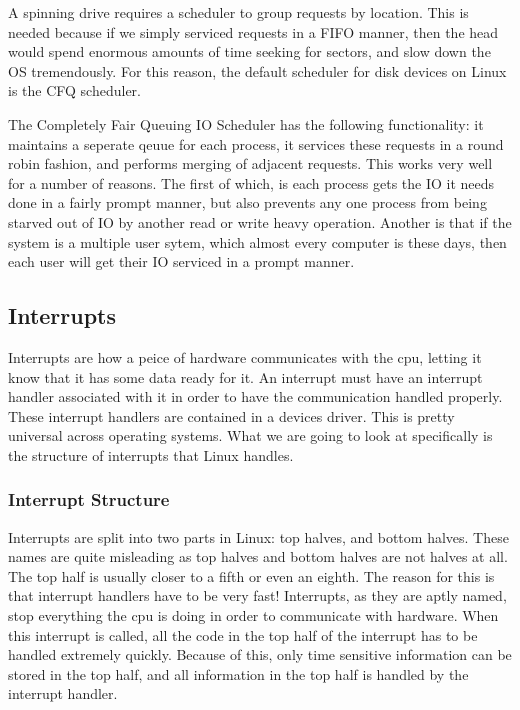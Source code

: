 \documentclass[10pt,letterpaper,onecolumn,draftclsnofoot]{IEEEtran}
\begin{document}
  A spinning drive requires a scheduler to group requests by location. This is
  needed because if we simply serviced requests in a FIFO manner, then the head
  would spend enormous amounts of time seeking for sectors, and slow down the OS
  tremendously. For this reason, the default scheduler for disk devices on Linux
  is the CFQ scheduler.

  The Completely Fair Queuing IO Scheduler has the following functionality: it
  maintains a seperate qeuue for each process, it services these requests in a round
  robin fashion, and performs merging of adjacent requests. This works very well
  for a number of reasons. The first of which, is each process gets the IO it needs
  done in a fairly prompt manner, but also prevents any one process from being
  starved out of IO by another read or write heavy operation. Another is that
  if the system is a multiple user sytem, which almost every computer is these
  days, then each user will get their IO serviced in a prompt manner. \cite{robertlove2010}

  \subsection{Interrupts}
  Interrupts are how a peice of hardware communicates with the cpu, letting it
  know that it has some data ready for it. An interrupt must have an interrupt
  handler associated with it in order to have the communication handled properly.
  These interrupt handlers are contained in a devices driver. This is pretty
  universal across operating systems. What we are going to look at specifically
  is the structure of interrupts that Linux handles. \cite{robertlove2010}

  \subsubsection{Interrupt Structure}
  Interrupts are split into two parts in Linux: top halves, and bottom halves.
  These names are quite misleading as top halves and bottom halves are not halves
  at all. The top half is usually closer to a fifth or even an eighth. The reason
  for this is that interrupt handlers have to be very fast! Interrupts, as they
  are aptly named, stop everything the cpu is doing in order to communicate with
  hardware. When this interrupt is called, all the code in the top half of the
  interrupt has to be handled extremely quickly. Because of this, only time sensitive
  information can be stored in the top half, and all information in the top half
  is handled by the interrupt handler.
\end{document}
